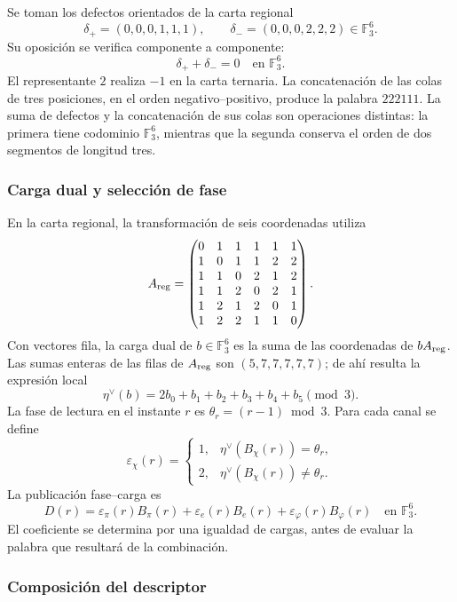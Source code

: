 Se toman los defectos orientados de la carta regional
\[
 \delta_+=(0,0,0,1,1,1),\qquad
 \delta_-=(0,0,0,2,2,2)\in\mathbb F_3^6.
\]
Su oposición se verifica componente a componente:
\[
 \delta_++\delta_-=0\quad\text{en }\mathbb F_3^6.
\]
El representante $2$ realiza $-1$ en la carta ternaria. La concatenación
de las colas de tres posiciones, en el orden negativo--positivo, produce
la palabra $222111$. La suma de defectos y la concatenación de sus
colas son operaciones distintas: la primera tiene codominio
$\mathbb F_3^6$, mientras que la segunda conserva el orden de dos
segmentos de longitud tres.

\subsubsection{Carga dual y selección de fase}

En la carta regional, la transformación de seis coordenadas utiliza
\[
 A_{\rm reg}=
 \begin{pmatrix}
 0&1&1&1&1&1\\
 1&0&1&1&2&2\\
 1&1&0&2&1&2\\
 1&1&2&0&2&1\\
 1&2&1&2&0&1\\
 1&2&2&1&1&0
 \end{pmatrix}.
\]
Con vectores fila, la carga dual de $b\in\mathbb F_3^6$ es la suma
de las coordenadas de $bA_{\rm reg}$. Las sumas enteras de las filas de
$A_{\rm reg}$ son $(5,7,7,7,7,7)$; de ahí resulta la expresión local
\begin{equation}
 \eta^\vee(b)=2b_0+b_1+b_2+b_3+b_4+b_5\pmod3.
 \label{eq:kdes-cargadual}
\end{equation}
La fase de lectura en el instante $r$ es
$\theta_r=(r-1)\bmod3$. Para cada canal se define
\[
 \varepsilon_\chi(r)=
 \begin{cases}
 1,&\eta^\vee(B_\chi(r))=\theta_r,\\
 2,&\eta^\vee(B_\chi(r))\ne\theta_r.
 \end{cases}
\]
La publicación fase--carga es
\begin{equation}
 D(r)=\varepsilon_\pi(r)B_\pi(r)
      +\varepsilon_e(r)B_e(r)
      +\varepsilon_\varphi(r)B_\varphi(r)
      \quad\text{en }\mathbb F_3^6.
 \label{eq:kdes-fasecarga}
\end{equation}
El coeficiente se determina por una igualdad de cargas, antes de evaluar
la palabra que resultará de la combinación.

\subsubsection{Composición del descriptor}

